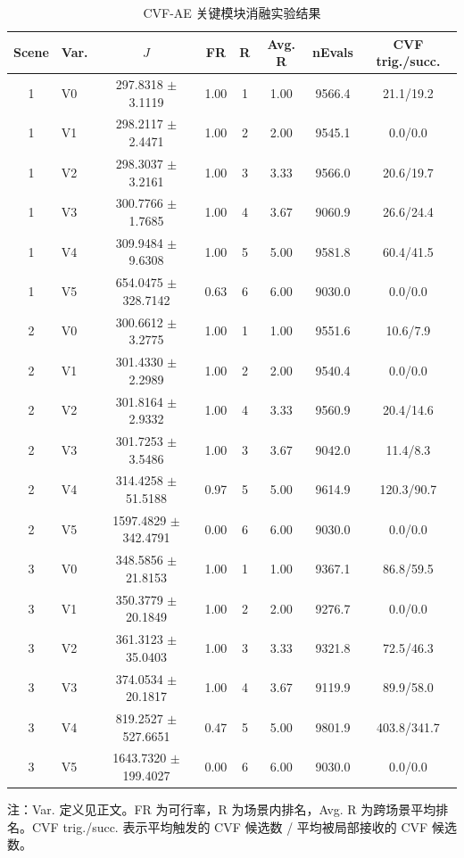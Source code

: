 ﻿\begin{table}[!t]
\centering
\caption{CVF-AE 关键模块消融实验结果}
\label{tab:ablation}
\setlength{\tabcolsep}{3pt}
\scriptsize
\begin{tabular*}{\textwidth}{@{\extracolsep{\fill}}clcccccc@{}}
\toprule
Scene & Var. & $J$ & FR & R & Avg. R & nEvals & CVF trig./succ. \\
\midrule
1 & V0 & 297.8318 $\pm$ 3.1119 & 1.00 & 1 & 1.00 & 9566.4 & 21.1/19.2 \\
1 & V1 & 298.2117 $\pm$ 2.4471 & 1.00 & 2 & 2.00 & 9545.1 & 0.0/0.0 \\
1 & V2 & 298.3037 $\pm$ 3.2161 & 1.00 & 3 & 3.33 & 9566.0 & 20.6/19.7 \\
1 & V3 & 300.7766 $\pm$ 1.7685 & 1.00 & 4 & 3.67 & 9060.9 & 26.6/24.4 \\
1 & V4 & 309.9484 $\pm$ 9.6308 & 1.00 & 5 & 5.00 & 9581.8 & 60.4/41.5 \\
1 & V5 & 654.0475 $\pm$ 328.7142 & 0.63 & 6 & 6.00 & 9030.0 & 0.0/0.0 \\
2 & V0 & 300.6612 $\pm$ 3.2775 & 1.00 & 1 & 1.00 & 9551.6 & 10.6/7.9 \\
2 & V1 & 301.4330 $\pm$ 2.2989 & 1.00 & 2 & 2.00 & 9540.4 & 0.0/0.0 \\
2 & V2 & 301.8164 $\pm$ 2.9332 & 1.00 & 4 & 3.33 & 9560.9 & 20.4/14.6 \\
2 & V3 & 301.7253 $\pm$ 3.5486 & 1.00 & 3 & 3.67 & 9042.0 & 11.4/8.3 \\
2 & V4 & 314.4258 $\pm$ 51.5188 & 0.97 & 5 & 5.00 & 9614.9 & 120.3/90.7 \\
2 & V5 & 1597.4829 $\pm$ 342.4791 & 0.00 & 6 & 6.00 & 9030.0 & 0.0/0.0 \\
3 & V0 & 348.5856 $\pm$ 21.8153 & 1.00 & 1 & 1.00 & 9367.1 & 86.8/59.5 \\
3 & V1 & 350.3779 $\pm$ 20.1849 & 1.00 & 2 & 2.00 & 9276.7 & 0.0/0.0 \\
3 & V2 & 361.3123 $\pm$ 35.0403 & 1.00 & 3 & 3.33 & 9321.8 & 72.5/46.3 \\
3 & V3 & 374.0534 $\pm$ 20.1817 & 1.00 & 4 & 3.67 & 9119.9 & 89.9/58.0 \\
3 & V4 & 819.2527 $\pm$ 527.6651 & 0.47 & 5 & 5.00 & 9801.9 & 403.8/341.7 \\
3 & V5 & 1643.7320 $\pm$ 199.4027 & 0.00 & 6 & 6.00 & 9030.0 & 0.0/0.0 \\
\bottomrule
\end{tabular*}
\vspace{1mm}
\parbox{\textwidth}{\footnotesize 注：Var. 定义见正文。FR 为可行率，R 为场景内排名，Avg. R 为跨场景平均排名。CVF trig./succ. 表示平均触发的 CVF 候选数 / 平均被局部接收的 CVF 候选数。}
\end{table}
